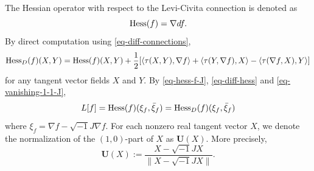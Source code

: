 \documentclass[12pt]{amsart}
\def\ii{{\sqrt{-1}}}
\def\vv<#1,#2>{\left\langle#1,#2\right\rangle}
\theoremstyle{definition}
\theoremstyle{remark}
\numberwithin{equation}{section}
\def\Hess{{\rm Hess}}
\begin{document}
The Hessian operator with respect to the Levi-Civita connection is denoted as
\begin{equation}
\Hess(f)=\nabla df.
\end{equation}
By direct computation using \eqref{eq-diff-connections},
\begin{equation}\label{eq-diff-hess}
\Hess_D(f)(X,Y)=\Hess(f)(X,Y)+\frac{1}{2}[\vv<\tau(X,Y),\nabla
f>+\vv<\tau(Y,\nabla f),X>-\vv<\tau(\nabla f,X),Y>]
\end{equation}
for any tangent vector fields $X$ and $Y$. By \eqref{eq-hess-f-J}, \eqref{eq-diff-hess} and \eqref{eq-vanishing-1-1-J},
\begin{equation}\label{eq-L-f-L}
L[f]=\Hess(f)(\xi_f,\bar\xi_f)=\Hess_D(f)(\xi_f,\bar\xi_f)
\end{equation}
where $\xi_f=\nabla f-\ii J\nabla f$. For each nonzero real tangent vector $X$, we denote the normalization of the $(1,0)$-part of $X$ as $\mathbf{U}(X)$. More precisely,
\begin{equation}
\mathbf{U}(X):=\frac{X-\ii JX}{\|X-\ii JX\|}.
\end{equation}
\end{document}
